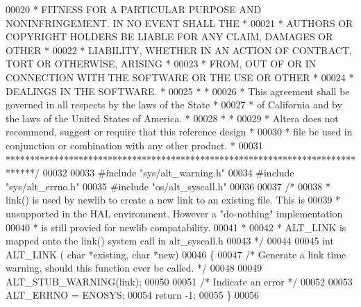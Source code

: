 \begin{DoxyCode}
00020 \textcolor{comment}{* FITNESS FOR A PARTICULAR PURPOSE AND NONINFRINGEMENT. IN NO EVENT SHALL THE *}
00021 \textcolor{comment}{* AUTHORS OR COPYRIGHT HOLDERS BE LIABLE FOR ANY CLAIM, DAMAGES OR OTHER      *}
00022 \textcolor{comment}{* LIABILITY, WHETHER IN AN ACTION OF CONTRACT, TORT OR OTHERWISE, ARISING     *}
00023 \textcolor{comment}{* FROM, OUT OF OR IN CONNECTION WITH THE SOFTWARE OR THE USE OR OTHER         *}
00024 \textcolor{comment}{* DEALINGS IN THE SOFTWARE.                                                   *}
00025 \textcolor{comment}{*                                                                             *}
00026 \textcolor{comment}{* This agreement shall be governed in all respects by the laws of the State   *}
00027 \textcolor{comment}{* of California and by the laws of the United States of America.              *}
00028 \textcolor{comment}{*                                                                             *}
00029 \textcolor{comment}{* Altera does not recommend, suggest or require that this reference design    *}
00030 \textcolor{comment}{* file be used in conjunction or combination with any other product.          *}
00031 \textcolor{comment}{******************************************************************************/}
00032 
00033 \textcolor{preprocessor}{#include "sys/alt_warning.h"}
00034 \textcolor{preprocessor}{#include "sys/alt_errno.h"}
00035 \textcolor{preprocessor}{#include "os/alt_syscall.h"}
00036 
00037 \textcolor{comment}{/*}
00038 \textcolor{comment}{ * link() is used by newlib to create a new link to an existing file. This is }
00039 \textcolor{comment}{ * unsupported in the HAL environment. However a "do-nothing" implementation }
00040 \textcolor{comment}{ * is still provied for newlib compatability. }
00041 \textcolor{comment}{ *}
00042 \textcolor{comment}{ * ALT\_LINK is mapped onto the link() system call in alt\_syscall.h}
00043 \textcolor{comment}{ */}
00044  
00045 \textcolor{keywordtype}{int} ALT_LINK ( \textcolor{keywordtype}{char} *existing, \textcolor{keywordtype}{char} *\textcolor{keyword}{new})
00046 \{
00047   \textcolor{comment}{/* Generate a link time warning, should this function ever be called. */}
00048 
00049   ALT_STUB_WARNING(link);
00050 
00051   \textcolor{comment}{/* Indicate an error */}
00052 
00053   ALT_ERRNO = ENOSYS;
00054   \textcolor{keywordflow}{return} -1;
00055 \}
00056 
\end{DoxyCode}
